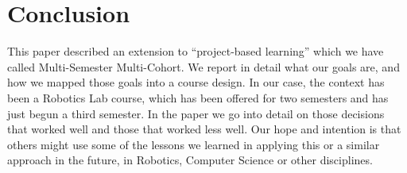 \section{Conclusion}
This paper described an extension to ``project-based learning''\cite{projects} which we have called Multi-Semester Multi-Cohort. We report in detail what our goals are, and how we mapped those goals into a course design. In our case, the context has been a Robotics Lab course, which has been offered for two semesters and has just begun a third semester. In the paper we go into detail on those decisions that worked well and those that worked less well. Our hope and intention is that others might use some of the lessons we learned in applying this or a similar approach in the future, in Robotics, Computer Science or other disciplines.
